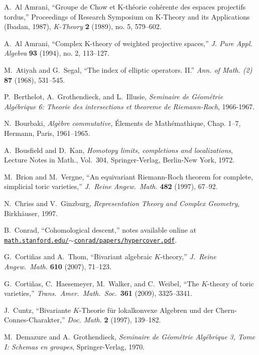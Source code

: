 \documentclass[11pt]{amsart}
\theoremstyle{definition}
\begin{document}
\begin{thebibliography}{CHWW}

 A.~Al Amrani, ``Groupe de Chow et K-th\'eorie coh\'erente des espaces projectifs tordus,'' Proceedings of Research Symposium on K-Theory and its Applications (Ibadan, 1987), {\em K-Theory} {\bf 2} (1989), no. 5, 579--602.

 A.~Al Amrani, ``Complex K-theory of weighted projective spaces,'' {\em J. Pure Appl. Algebra} {\bf 93} (1994), no. 2, 113--127.

 M.~Atiyah and G.~Segal, ``The index of elliptic operators. II.'' {\em Ann. of Math. (2)} {\bf 87} (1968), 531--545.

 P.~Berthelot, A.~Grothendieck, and L.~Illusie, {\em Seminaire de G\'eom\'etrie Alg\'ebrique 6: Theorie des intersections et theoreme de Riemann-Roch}, 1966-1967.

 N.~Bourbaki, {\em Alg\`ebre commutative}, \'Elements de Math\'emathique, Chap. 1--7, Hermann, Paris, 1961--1965.

 A.~Bousfield and D.~Kan, {\em Homotopy limits, completions and localizations}, Lecture Notes in Math., Vol.~304, Springer-Verlag, Berlin-New York, 1972.

 M.~Brion and M.~Vergne, ``An equivariant Riemann-Roch theorem for complete, simplicial toric varieties,'' {\em J.~Reine Angew.~Math.} {\bf 482} (1997), 67--92.

 N.~Chriss and V.~Ginzburg, \emph{Representation Theory and Complex Geometry}, Birkh\"auser, 1997.

 B.~Conrad, ``Cohomological descent,'' notes available online at \texttt{\href{http://math.stanford.edu/~conrad/papers/hypercover.pdf}{math.stanford.edu/$\sim$conrad/papers/hypercover.pdf}}.

 G.~Corti\~nas and A.~Thom, ``Bivariant algebraic $K$-theory,'' {\em J.~Reine Angew.~Math.} {\bf 610} (2007), 71--123.

 G.~Corti\~nas, C.~Haesemeyer, M.~Walker, and C.~Weibel, ``The $K$-theory of toric varieties,'' {\em Trans.~Amer.~Math.~Soc.}~{\bf 361} (2009), 3325--3341.

 J.~Cuntz, ``Bivariante $K$-Theorie f\"ur lokalkonvexe Algebren und der Chern-Connes-Charakter,'' {\em 
Doc. Math.} {\bf 2} (1997), 139--182.

 M.~Demazure and A.~Grothendieck, {\em Seminaire de G\'eom\'etrie Alg\'ebrique 3, Tome I: Schemas en groupes}, Springer-Verlag, 1970.


\end{thebibliography}
\end{document}
